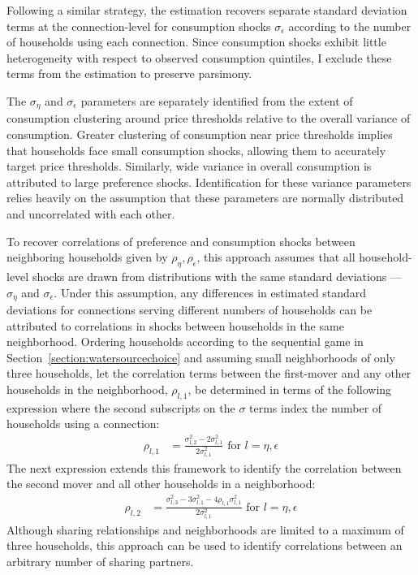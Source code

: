 \documentclass[12pt]{article}
\begin{document}
Following a similar strategy, the estimation recovers separate standard deviation terms at the connection-level for consumption shocks $\sigma_{\epsilon}$ according to the number of households using each connection.  Since consumption shocks exhibit little heterogeneity with respect to observed consumption quintiles, I exclude these terms from the estimation to preserve parsimony.

The $\sigma_{\eta}$ and $\sigma_{\epsilon}$ parameters are separately identified from the extent of consumption clustering around price thresholds relative to the overall variance of consumption.  Greater clustering of consumption near price thresholds implies that households face small consumption shocks, allowing them to accurately target price thresholds.  Similarly, wide variance in overall consumption is attributed to large preference shocks.  Identification for these variance parameters relies heavily on the assumption that these parameters are normally distributed and uncorrelated with each other.

To recover correlations of preference and consumption shocks between neighboring households given by $\rho_{\eta}, \rho_{\epsilon}$, this approach assumes that all household-level shocks are drawn from distributions with the same standard deviations --- $\sigma_{\eta}$ and $\sigma_{\epsilon}$.  Under this assumption, any differences in estimated standard deviations for connections serving different numbers of households can be attributed to correlations in shocks between households in the same neighborhood.  Ordering households according to the sequential game in Section~\ref{section:watersourcechoice} and assuming small neighborhoods of only three households, let the correlation terms between the first-mover and any other households in the neighborhood, $\rho_{l,1}$, be determined in terms of the following expression where the second subscripts on the $\sigma$ terms index the number of households using a connection:
\begin{align*}
\rho_{l,1} &= \frac{\sigma_{l,2}^2 - 2\sigma_{l,1}^2}{2\sigma_{l,1}^2} \text{ for } l =  \eta, \epsilon 
\end{align*}
The next expression extends this framework to identify the correlation between the second mover and all other households in a neighborhood:
\begin{align*}
\rho_{l,2} &= \frac{\sigma_{l,3}^2 - 3\sigma_{l,1}^2- 4 \rho_{l,1} \sigma_{l,1}^2 }{2\sigma_{l,1}^2 } \text{ for } l =  \eta, \epsilon
\end{align*}
Although sharing relationships and neighborhoods are limited to a maximum of three households, this approach can be used to identify correlations between an arbitrary number of sharing partners.
\end{document}
